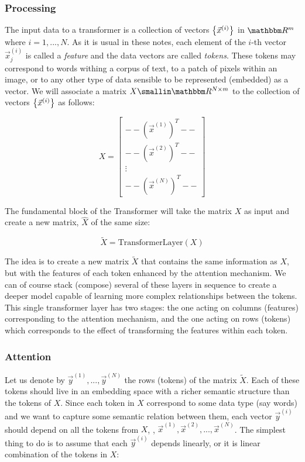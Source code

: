\subsubsection{Processing}\label{subsubsec:processing}

The input data to a transformer is a collection of vectors $\left\lbrace \vec{x}^{(i)} \right\rbrace$ in $\RR^m$ where ${i=1,...,N}$. As it is usual in these notes, each element of the $i$-th vector $\vec{x}^{(i)}_j$ is called a \emph{feature} and the data vectors are called \emph{tokens}. These tokens may correspond to words withing a corpus of text, to a patch of pixels within an image, or to any other type of data sensible to be represented (embedded) as a vector. We will associate a matrix $X \in \RR^{N \times m}$ to the collection of vectors $\left\lbrace \vec{x}^{(i)} \right\rbrace$ as follows: 

\begin{equation}
    X = \begin{bmatrix}
       -- (\vec{x}^{(1)})^T -- \\
       -- (\vec{x}^{(2)})^T -- \\
        \vdots \\
       -- (\vec{x}^{(N)})^T --
    \end{bmatrix} 
\end{equation}   

The fundamental block of the Transformer will take the matrix $X$ as input and create a new matrix, $\widehat{X}$ of the same size: 

$$
\widetilde{X} = \textrm{TransformerLayer}(X)
$$

The idea is to create a new matrix $\widetilde{X}$ that contains the same information as $X$, but with the features of each token enhanced by the attention mechanism. We can of course stack (compose) several of these layers in sequence to create a deeper model capable of learning more complex relationships between the tokens. This single transformer layer has two stages: the one acting on columns (features) corresponding to the attention mechanism, and the one acting on rows (tokens) which corresponds to the effect of transforming the features within each token. 


\subsubsection*{Attention}

Let us denote by $\vec{y}^{(1)},...,\vec{y}^{(N)}$ the rows (tokens) of the matrix $\widetilde{X}$. Each of these tokens should live in an embedding space with a richer semantic structure than the tokens of $X$. Since each token in $X$ correspond to some data type (say words) and we want to capture some semantic relation between them, each vector $\vec{y}^{(i)}$ should depend on all the tokens from $X$, \ie, $\vec{x}^{(1)}, \vec{x}^{(2)},...,\vec{x}^{(N)}$. The simplest thing to do is to assume that each $\vec{y}^{(i)}$ depends linearly, or it is linear combination of the tokens in $X$: 

